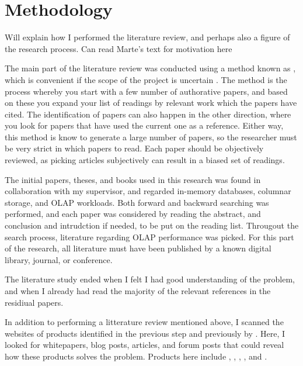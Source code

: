\section{Methodology}
\label{sec:Methodology}
\begin{secex}
  Will explain how I performed the literature review, and perhaps also a figure of the research process. Can read Marte's text for motivation here
\end{secex}

The main part of the literature review was conducted using a method known as , which is convenient if the scope of the project is uncertain \cite{Ang2014-nm}. The  method is the process whereby you start with a few number of authorative papers, and based on these you expand your list of readings by relevant work which the papers have cited. The identification of papers can also happen in the other direction, where you look for papers that have used the current one as a reference. Either way, this method is know to generate a large number of papers, so the researcher must be very strict in which papers to read. Each paper should be objectively reviewed, as picking articles subjectively can result in a biased set of readings.

The initial papers, theses, and books used in this research was found in collaboration with my supervisor, and regarded in-memory databases, columnar storage, and OLAP workloads. Both forward and backward searching was performed, and each paper was considered by reading the abstract, and conclusion and intrudction if needed, to be put on the reading list. Througout the search process, literature regarding OLAP performance was picked. For this part of the research, all literature must have been published by a known digital library, journal, or conference. 

The literature study ended when I felt I had good understanding of the problem, and when I already had read the majority of the relevant references in the residiual papers.

In addition to performing a  litterature review mentioned above, I scanned the websites of products identified in the previous step and previously by \genus. Here, I looked for whitepapers, blog posts, articles, and forum posts that could reveal how these products solves the problem. Products here include , , , , and .
